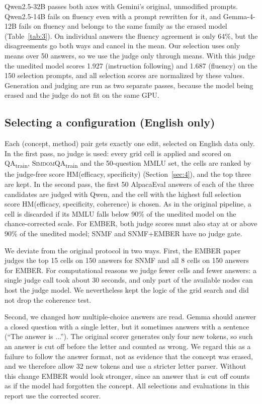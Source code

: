 \documentclass[11pt]{article}
\newcommand{\qatrain}{\textsc{QA}\textsubscript{train}}
\newcommand{\simdomtrain}{\textsc{SimdomQA}\textsubscript{train}}
\begin{document}
Qwen2.5-32B passes both axes with Gemini's original, unmodified prompts. Qwen2.5-14B fails on fluency even with a prompt rewritten for it, and Gemma-4-12B fails on fluency and belongs to the same family as the erased model (Table~\ref{tab:3}). On individual answers the fluency agreement is only 64\%, but the disagreements go both ways and cancel in the mean. Our selection uses only means over 50 answers, so we use the judge only through means. With this judge the unedited model scores 1.927 (instruction following) and 1.687 (fluency) on the 150 selection prompts, and all selection scores are normalized by these values. Generation and judging are run as two separate passes, because the model being erased and the judge do not fit on the same GPU.

\subsection{Selecting a configuration (English only)}\label{sec:3.5}

Each (concept, method) pair gets exactly one edit, selected on English data only. In the first pass, no judge is used: every grid cell is applied and scored on \qatrain{}, \simdomtrain{} and the 50-question MMLU set, the cells are ranked by the judge-free score HM(efficacy, specificity) (Section~\ref{sec:4}), and the top three are kept. In the second pass, the first 50 AlpacaEval answers of each of the three candidates are judged with Qwen, and the cell with the highest full selection score HM(efficacy, specificity, coherence) is chosen. As in the original pipeline, a cell is discarded if its MMLU falls below 90\% of the unedited model on the chance-corrected scale. For EMBER, both judge scores must also stay at or above 90\% of the unedited model; SNMF and SNMF+EMBER have no judge gate.

We deviate from the original protocol in two ways. First, the EMBER paper judges the top 15 cells on 150 answers for SNMF and all 8 cells on 150 answers for EMBER. For computational reasons we judge fewer cells and fewer answers: a single judge call took about 30 seconds, and only part of the available nodes can host the judge model. We nevertheless kept the logic of the grid search and did not drop the coherence test.

Second, we changed how multiple-choice answers are read. Gemma should answer a closed question with a single letter, but it sometimes answers with a sentence (``The answer is ...''). The original scorer generates only four new tokens, so such an answer is cut off before the letter and counted as wrong. We regard this as a failure to follow the answer format, not as evidence that the concept was erased, and we therefore allow 32 new tokens and use a stricter letter parser. Without this change EMBER would look stronger, since an answer that is cut off counts as if the model had forgotten the concept. All selections and evaluations in this report use the corrected scorer.
\end{document}
